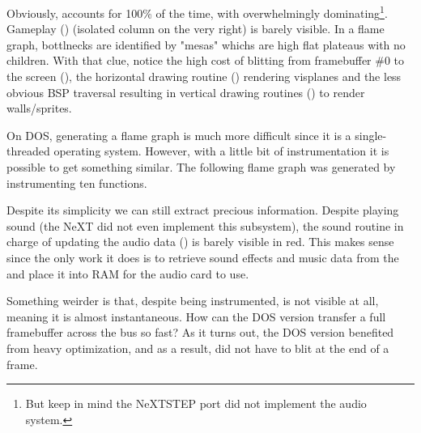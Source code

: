 \par
Obviously,  accounts for 100\% of the time, with  overwhelmingly dominating\footnote{But keep in mind the NeXTSTEP port did not implement the audio system.}. Gameplay () (isolated column on the very right) is barely visible. In a flame graph, bottlnecks are identified by "mesas" whichs are high flat plateaus with no children. With that clue, notice the high cost of blitting from framebuffer \#0 to the screen (), the horizontal drawing routine () rendering visplanes and the less obvious BSP traversal resulting in vertical drawing routines () to render walls/sprites.




On DOS, generating a flame graph is much more difficult since it is a single-threaded operating system. However, with a little bit of instrumentation it is possible to get something similar. The following flame graph was generated by instrumenting ten functions.\\
\par
\vspace{4mm}
\par
 Despite its simplicity we can still extract precious information. Despite playing sound (the NeXT did not even implement this subsystem), the sound routine in charge of updating the audio data () is barely visible in red. This makes sense since the only work it does is to retrieve sound effects and music data from the  and place it into RAM for the audio card to use.\\
\par
 Something weirder is that, despite being instrumented,  is not visible at all, meaning it is almost instantaneous. How can the DOS version transfer a full framebuffer across the bus so fast? As it turns out, the DOS version benefited from heavy optimization, and as a result, did not have to blit at the end of a frame.\\
\par

